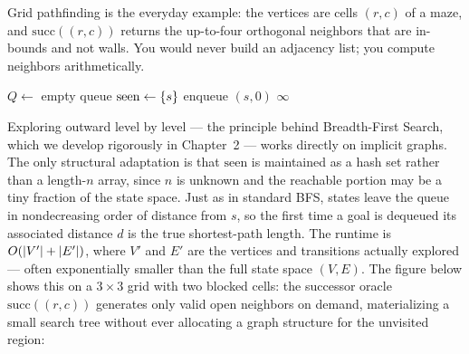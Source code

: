 Grid pathfinding is the everyday example: the vertices are cells $(r,c)$ of a
maze, and $\mathrm{succ}((r,c))$ returns the up-to-four orthogonal neighbors that
are in-bounds and not walls. You would never build an adjacency list; you
compute neighbors arithmetically.

\begin{algorithm}[H]
\caption{\textsc{ImplicitBFS}: shortest path on an on-demand graph}
\label{ch01:alg-implicit-bfs}
$Q \gets$ empty queue\; $\mathrm{seen} \gets \{s\}$\; enqueue $(s, 0)$\;
\Return $\infty$\;
\end{algorithm}

Exploring outward level by level --- the principle behind Breadth-First Search,
which we develop rigorously in Chapter~2 --- works directly on implicit graphs.
The only structural adaptation is that $\mathrm{seen}$ is maintained as a hash set
rather than a length-$n$ array, since $n$ is unknown and the reachable portion
may be a tiny fraction of the state space. Just as in standard BFS, states leave
the queue in nondecreasing order of distance from $s$, so the first time a goal
is dequeued its associated distance $d$ is the true shortest-path length.
The runtime is $O(\lvert V'\rvert + \lvert E'\rvert)$, where $V'$ and $E'$ are the vertices
and transitions actually explored --- often exponentially smaller than the full
state space $(V, E)$. The figure below shows this on a $3\times 3$ grid with two
blocked cells: the successor oracle $\mathrm{succ}((r,c))$ generates only valid
open neighbors on demand, materializing a small search tree without ever
allocating a graph structure for the unvisited region:

